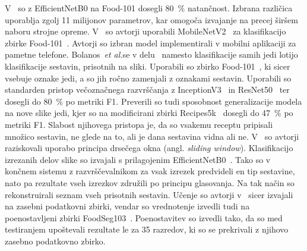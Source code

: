 \documentclass[a4paper,twoside,openright,12pt,slovene]{book}
\newcommand{\etal}{\textit{et al.}} %
\begin{document}
            V~\cite{src:vijayakumari2022food} so z EfficientNetB0 na Food-101
            dosegli 80~\% natančnost. Izbrana različica uporablja zgolj 11
            milijonov parametrov, kar omogoča izvajanje na precej širšem naboru
            strojne opreme.
            V~\cite{src:moumane2023food} so avtorji  uporabili
            MobileNetV2~\cite{src:sandler2018mobilenetv2} za klasifikacijo
            zbirke Food-101~\cite{src:bossard2014food}. Avtorji so izbran model
            implementirali v mobilni aplikaciji za pametne telefone.
            Bolanos~\etal se v delu~\cite{src:bolanos2017food} namesto
            klasifikacije samih jedi lotijo klasifikacije sestavin, prisotnih
            na sliki. Uporabili so zbirko Food-101~\cite{src:bossard2014food},
            ki sicer vsebuje oznake jedi, a so jih ročno zamenjali z oznakami
            sestavin. Uporabili so standarden pristop večoznačnega razvrščanja z
            InceptionV3~\cite{src:szegedy2016rethinking} in
            ResNet50~\cite{src:he2016deep} ter dosegli do 80~\% po
            metriki F1. %
            Preverili so tudi
            sposobnost generalizacije modela na nove slike jedi, kjer so na
            modificirani zbirki Recipes5k~\cite{src:bolanos2017food} dosegli do
            47~\% po metriki F1. Slabost njihovega pristopa je, da so vsakemu
            receptu pripisali množico sestavin, ne glede na to, ali je dana
            sestavina vidna ali ne. V~\cite{src:fu2024recognizing} so avtorji
            raziskovali uporabo principa drsečega okna (angl. \textit{sliding
            window}). Klasifikacijo izrezanih delov slike so izvajali s
            prilagojenim EfficientNetB0~\cite{src:tan2019efficientnet}. Tako so
            v končnem sistemu z razvrščevalnikom za vsak izrezek predvideli en
            tip sestavine, nato pa rezultate vseh izrezkov združili po principu
            glasovanja. Na tak način so rekonstruirali seznam vseh prisotnih
            sestavin. Učenje so avtorji v~\cite{src:fu2024recognizing} sicer
            izvajali na zasebni podatkovni zbirki, vendar so vrednotenje izvedli
            tudi na poenostavljeni zbirki FoodSeg103~\cite{src:wu2021large}.
            Poenostavitev so izvedli tako, da so med testiranjem upoštevali
            rezultate le za 35 razredov, ki so se prekrivali z njihovo zasebno
            podatkovno zbirko.
\end{document}
